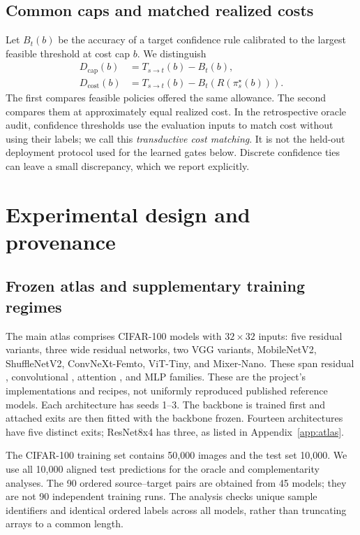 \documentclass[11pt,a4paper]{article}
\begin{document}
\subsection{Common caps and matched realized costs}
Let $B_t(b)$ be the accuracy of a target confidence rule calibrated to the largest feasible threshold at cost cap $b$. We distinguish
\begin{align}
 D_{\mathrm{cap}}(b)&=T_{s\rightarrow t}(b)-B_t(b),\\
 D_{\mathrm{cost}}(b)&=T_{s\rightarrow t}(b)-B_t(R(\pi_s^\star(b))).
 \label{eq:comparison}
\end{align}
The first compares feasible policies offered the same allowance. The second compares them at approximately equal realized cost. In the retrospective oracle audit, confidence thresholds use the evaluation inputs to match cost without using their labels; we call this \emph{transductive cost matching}. It is not the held-out deployment protocol used for the learned gates below. Discrete confidence ties can leave a small discrepancy, which we report explicitly.

\section{Experimental design and provenance}
\subsection{Frozen atlas and supplementary training regimes}
The main atlas comprises CIFAR-100 \citep{cifar} models with $32\times32$ inputs: five residual variants, three wide residual networks, two VGG variants, MobileNetV2, ShuffleNetV2, ConvNeXt-Femto, ViT-Tiny, and Mixer-Nano. These span residual \citep{resnet,wide}, convolutional \citep{vgg,mobile,shuffle,convnext}, attention \citep{vit}, and MLP \citep{mixer} families. These are the project's implementations and recipes, not uniformly reproduced published reference models. Each architecture has seeds 1--3. The backbone is trained first and attached exits are then fitted with the backbone frozen. Fourteen architectures have five distinct exits; ResNet8x4 has three, as listed in Appendix~\ref{app:atlas}.

The CIFAR-100 training set contains 50,000 images and the test set 10,000. We use all 10,000 aligned test predictions for the oracle and complementarity analyses. The 90 ordered source--target pairs are obtained from 45 models; they are not 90 independent training runs. The analysis checks unique sample identifiers and identical ordered labels across all models, rather than truncating arrays to a common length.
\end{document}
